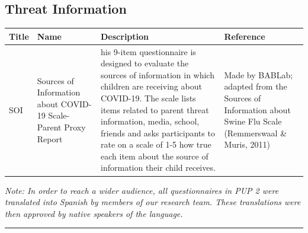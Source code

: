 \documentclass[]{book}
\begin{document}
\hypertarget{threat-information-1}{%
\subsection{Threat Information}\label{threat-information-1}}

\begin{longtable}[]{@{}llll@{}}
\toprule
\begin{minipage}[b]{0.13\columnwidth}\raggedright
Title\strut
\end{minipage} & \begin{minipage}[b]{0.21\columnwidth}\raggedright
Name\strut
\end{minipage} & \begin{minipage}[b]{0.38\columnwidth}\raggedright
Description\strut
\end{minipage} & \begin{minipage}[b]{0.15\columnwidth}\raggedright
Reference\strut
\end{minipage}\tabularnewline
\midrule
\endhead
\begin{minipage}[t]{0.13\columnwidth}\raggedright
SOI\strut
\end{minipage} & \begin{minipage}[t]{0.21\columnwidth}\raggedright
Sources of Information about COVID-19 Scale- Parent Proxy Report\strut
\end{minipage} & \begin{minipage}[t]{0.38\columnwidth}\raggedright
his 9-item questionnaire is designed to evaluate the sources of information in which children are receiving about COVID-19. The scale lists items related to parent threat information, media, school, friends and asks participants to rate on a scale of 1-5 how true each item about the source of information their child receives.\strut
\end{minipage} & \begin{minipage}[t]{0.15\columnwidth}\raggedright
Made by BABLab; adapted from the Sources of Information about Swine Flu Scale (Remmerswaal \& Muris, 2011)\strut
\end{minipage}\tabularnewline
\bottomrule
\end{longtable}

\emph{Note: In order to reach a wider audience, all questionnaires in PUP 2 were translated into Spanish by members of our research team. These translations were then approved by native speakers of the language.}

\begin{center}\rule{0.5\linewidth}{0.5pt}\end{center}
\end{document}
